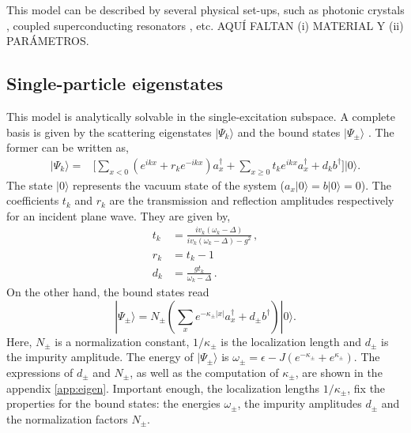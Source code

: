 \documentclass[aps,pra,twocolumn,floatfix,superscriptaddress]{revtex4-1}%
\begin{document}
This model can be described by several physical set-ups, such as photonic crystals \cite{Lodahl2015}, coupled superconducting resonators \cite{liu2016}, etc. {\color{red}AQU\'I FALTAN (i) MATERIAL Y (ii) PAR\'AMETROS.}


\subsection{Single-particle eigenstates}

This model is analytically solvable in the single-excitation subspace. A complete basis is given by the scattering eigenstates $|\Psi_k\rangle$ \cite{Nori2008a} and the bound states $|\Psi_\pm\rangle$ \cite{Longo2010,Longo2011}. The former can be written as,
\begin{align}
\label{eq:scattering_states} 
|\Psi_k\rangle = & \Big [ \sum_{x<0}(e^{ikx}+r_k e^{-ikx})a_x^\dagger 
 +  \sum_{x\geq 0} t_k e^{ikx} a_x^\dagger 
+ d_k b^\dagger \Big]  |0\rangle.
\end{align}
The state $|0\rangle$ represents the vacuum state of the system ($a_x|0\rangle=b|0\rangle = 0$).
The coefficients 
 $t_k$ and $r_k$ are the  
 transmission and reflection amplitudes respectively
for an incident plane wave.  They are given by, 
\begin{align}
\label{eq:transmission}
t_k & =\frac{iv_k(\omega_k - \Delta)}{iv_k(\omega_k-\Delta)-g^2} \, , 
\\
\label{eq:reflection}
r_k&=t_k-1 
\\ 
d_k  &= \frac{g t_k}{\omega_k-\Delta} \,
\label{eq:d_scattering_states}.
\end{align} 
On the other hand, the bound states read
\begin{equation}
 |\Psi_\pm\rangle =  N_\pm \left(\sum_x e^{-\kappa_\pm |x|} a_x^\dagger + d_\pm b^\dagger\right)|0\rangle.\label{eq:bound_states}
\end{equation} 
Here, $N_\pm$ is a normalization constant, $1/\kappa_\pm$ is the localization length and $d_\pm$ is  the impurity amplitude. The energy of $|\Psi_\pm\rangle$ is $\omega_\pm = \epsilon - J(e^{-\kappa_\pm} + e^{\kappa_\pm})$. The expressions of $d_\pm$ and $N_\pm$, as well as the computation of $\kappa_\pm$, are shown in the appendix \ref{app:eigen}. Important enough, the localization lengths  $1/\kappa_\pm$, 
fix the properties for the bound states: the energies $\omega_\pm$, the impurity amplitudes $d_\pm$ and the normalization factors $N_\pm$.
\end{document}
